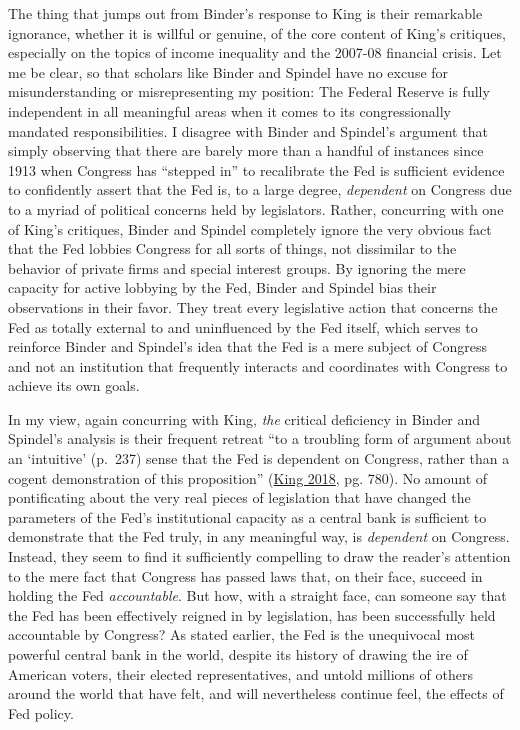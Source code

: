 \documentclass[
  12pt,
]{article}
\begin{document}
The thing that jumps out from Binder's response to King is their
remarkable ignorance, whether it is willful or genuine, of the core
content of King's critiques, especially on the topics of income
inequality and the 2007-08 financial crisis. Let me be clear, so that
scholars like Binder and Spindel have no excuse for misunderstanding or
misrepresenting my position: The Federal Reserve is fully independent in
all meaningful areas when it comes to its congressionally mandated
responsibilities. I disagree with Binder and Spindel's argument that
simply observing that there are barely more than a handful of instances
since 1913 when Congress has ``stepped in'' to recalibrate the Fed is
sufficient evidence to confidently assert that the Fed is, to a large
degree, \emph{dependent} on Congress due to a myriad of political
concerns held by legislators. Rather, concurring with one of King's
critiques, Binder and Spindel completely ignore the very obvious fact
that the Fed lobbies Congress for all sorts of things, not dissimilar to
the behavior of private firms and special interest groups. By ignoring
the mere capacity for active lobbying by the Fed, Binder and Spindel
bias their observations in their favor. They treat every legislative
action that concerns the Fed as totally external to and uninfluenced by
the Fed itself, which serves to reinforce Binder and Spindel's idea that
the Fed is a mere subject of Congress and not an institution that
frequently interacts and coordinates with Congress to achieve its own
goals.

In my view, again concurring with King, \emph{the} critical deficiency
in Binder and Spindel's analysis is their frequent retreat ``to a
troubling form of argument about an `intuitive' (p.~237) sense that the
Fed is dependent on Congress, rather than a cogent demonstration of this
proposition'' (\protect\hyperlink{ref-king2018b}{King 2018}, pg. 780).
No amount of pontificating about the very real pieces of legislation
that have changed the parameters of the Fed's institutional capacity as
a central bank is sufficient to demonstrate that the Fed truly, in any
meaningful way, is \emph{dependent} on Congress. Instead, they seem to
find it sufficiently compelling to draw the reader's attention to the
mere fact that Congress has passed laws that, on their face, succeed in
holding the Fed \emph{accountable}. But how, with a straight face, can
someone say that the Fed has been effectively reigned in by legislation,
has been successfully held accountable by Congress? As stated earlier,
the Fed is the unequivocal most powerful central bank in the world,
despite its history of drawing the ire of American voters, their elected
representatives, and untold millions of others around the world that
have felt, and will nevertheless continue feel, the effects of Fed
policy.
\end{document}

